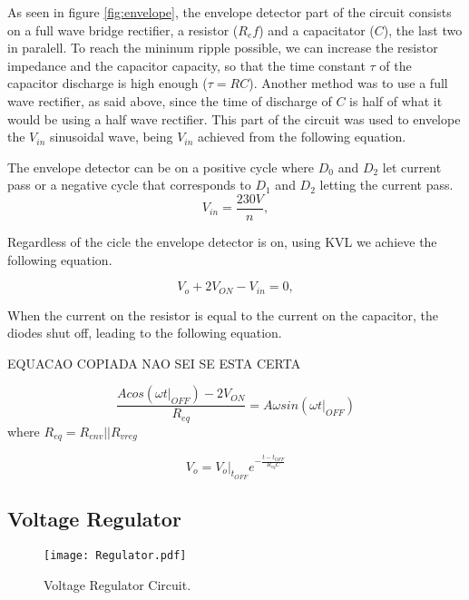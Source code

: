 As seen in figure \ref{fig:envelope}, the envelope detector part of the circuit consists on a full wave bridge rectifier, a resistor ($R_ef$) and a capacitator ($C$), the last two in paralell. To reach the mininum ripple possible, we can increase the resistor impedance and the capacitor capacity, so that the time constant $\tau$ of the capacitor discharge is high enough ($\tau=RC$). Another method was to use a full wave rectifier, as said above, since the time of discharge of $C$ is half of what it would be using a half wave rectifier. This part of the circuit was used to envelope the $V_{in}$ sinusoidal wave, being $V_{in}$ achieved from the following equation.

The envelope detector can be on a positive cycle where $D_0$ and $D_2$ let current pass or a negative cycle that corresponds to $D_1$ and $D_2$ letting the current pass.
\begin{equation}
  V_{in} = \frac{230V}{n},
  \label{eq:vin}
\end{equation}
 
Regardless of the cicle the envelope detector is on, using KVL we achieve the following equation.

\begin{equation}
    V_o + 2V_{ON} - V_{in} = 0,
 \label{eq:envelope2}  
\end{equation}

When the current on the resistor is equal to the current on the capacitor, the diodes shut off, leading to the following equation.

EQUACAO COPIADA NAO SEI SE ESTA CERTA

\begin{equation}
    \frac{Acos(\omega t|_{OFF})-2V_{ON}}{R_{eq}}=A\omega sin(\omega t|_{OFF})
\end{equation}
where $R_{eq}=R_{env}||R_{vreg}$

\begin{equation}
    V_o=V_o|_{t_{OFF}}e^{-\frac{t-t_{OFF}}{R_{eq}C}}
\end{equation}


\subsection{Voltage Regulator}
\label{sec:regulator}

\begin{figure}[h]
    \centering
    \texttt{[image: Regulator.pdf]}
    \caption{Voltage Regulator Circuit.}
    \label{fig:Regulator}
\end{figure}

